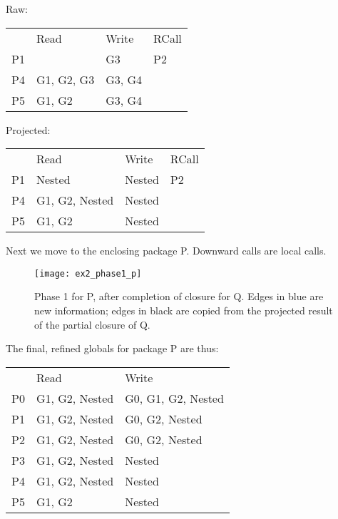 \documentclass{article}
\begin{document}
\begin{center}
\begin{multicols}{2}
  Raw:\\
  \begin{tabular}{llll}
       & Read       & Write  & RCall \\
    P1 &            & G3     & P2    \\
    P4 & G1, G2, G3 & G3, G4 &       \\
    P5 & G1, G2     & G3, G4 &       \\
  \end{tabular}

  \columnbreak
  Projected:\\
  \begin{tabular}{|llll}
       & Read           & Write  & RCall \\
    P1 & Nested         & Nested & P2    \\
    P4 & G1, G2, Nested & Nested &       \\
    P5 & G1, G2         & Nested &       \\
  \end{tabular}
\end{multicols}
\end{center}

\pagebreak
\noindent
Next we move to the enclosing package P. Downward calls are local calls.

\begin{figure}[h]
  \begin{center}
    \texttt{[image: ex2\_phase1\_p]}
  \end{center}
  \caption{Phase 1 for P, after completion of closure for Q. Edges in
    {\color{RoyalBlue}blue} are new information; edges in black are copied
    from the projected result of the partial closure of Q.}
\end{figure}

\noindent
The final, refined globals for package P are thus:

\begin{center}
  \begin{tabular}{lll}
       & Read           & Write              \\
    P0 & G1, G2, Nested & G0, G1, G2, Nested \\
    P1 & G1, G2, Nested & G0, G2, Nested     \\
    P2 & G1, G2, Nested & G0, G2, Nested     \\
    P3 & G1, G2, Nested & Nested             \\
    P4 & G1, G2, Nested & Nested             \\
    P5 & G1, G2         & Nested             \\
  \end{tabular}
\end{center}
\end{document}
